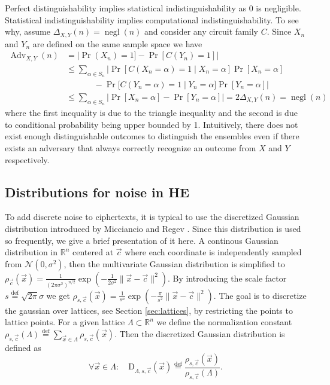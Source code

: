 Perfect distinguishability implies statistical indistinguishability as 0 is negligible. Statistical indistinguishability implies computational indistinguishability. To see why, assume $\Delta_{X,Y}(n) = \operatorname{negl}(n)$ and consider any circuit family $C$. Since $X_n$ and $Y_n$ are defined on the same sample space we have
\begin{equation*}
\begin{aligned}
    \operatorname{Adv}_{X,Y}(n) &= |\operatorname{Pr}(X_n) = 1] - \operatorname{Pr}[C(Y_n) = 1]|\\
        &\leq \sum_{\alpha \in S_n} | \operatorname{Pr}[C(X_n = \alpha) = 1 \; | \; X_n = \alpha]\operatorname{Pr}[X_n = \alpha] \\
        &\phantom{=} \qquad - \operatorname{Pr}[C(Y_n = \alpha) = 1 \; | \; Y_n = \alpha]\operatorname{Pr}[Y_n = \alpha] | \\
        &\leq \sum_{\alpha \in S_n} | \operatorname{Pr}[X_n = \alpha] - \operatorname{Pr}[Y_n = \alpha]| = 2\Delta_{X,Y}(n) = \operatorname{negl}(n)
\end{aligned}
\end{equation*}
where the first inequality is due to the triangle inequality and the second is due to conditional probability being upper bounded by 1. Intuitively, there does not exist enough distinguishable outcomes to distinguish the ensembles even if there exists an adversary that always correctly recognize an outcome from $X$ and $Y$ respectively.

\subsection*{Distributions for noise in HE}
To add discrete noise to ciphertexts, it is typical to use the discretized Gaussian distribution introduced by Micciancio and Regev \cite{disc-gauss}. Since this distribution is used so frequently, we give a brief presentation of it here. A continous Gaussian distribution in $\mathbb{R}^n$ centered at $\vec{c}$ where each coordinate is independently sampled from $\mathcal{N}(0, \sigma^2)$, then the multivariate Gaussian distribution is simplified to $\rho_{\vec{c}}(\vec{x})=\frac{1}{\left(2 \pi \sigma^2\right)^{n / 2}} \exp \left(-\frac{1}{2 \sigma^2} \| \vec{x}-\vec{c} \| ^2\right)$. By introducing the scale factor $s \stackrel{\mathrm{def}}{=} \sqrt{2\pi}\sigma$ we get $\rho_{s, \vec{c}}(\vec{x})=\frac{1}{s^n} \exp \left(-\frac{\pi}{s^2} \| \vec{x}-\vec{c} \| ^2\right)$.
The goal is to discretize the gaussian over lattices, see Section \ref{sec:lattices}, by restricting the points to lattice points. For a given lattice $\Lambda \subset \mathbb{R}^n$ we define the normalization constant $\rho_{s, \vec{c}}(\Lambda) \stackrel{\mathrm{def}}{=} \sum_{\vec{x} \in \Lambda} \rho_{s, \vec{c}}(\vec{x})$. Then the discretized Gaussian distribution is defined as
\begin{equation*}
\forall \vec{x} \in \Lambda \colon \quad \textrm{D}_{\Lambda, s, \vec{c}}(\vec{x}) \stackrel{\mathrm{def}}{=} \frac{\rho_{s, \vec{c}}(\vec{x})}{\rho_{s, \vec{c}}(\Lambda)}.
\end{equation*}

